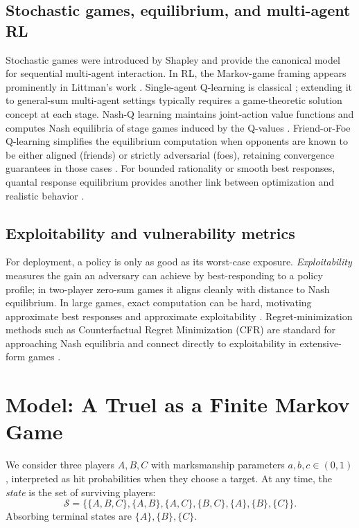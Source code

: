 \documentclass[11pt]{article}
\begin{document}
\subsection{Stochastic games, equilibrium, and multi-agent RL}
Stochastic games were introduced by Shapley \citep{Shapley1953} and provide the canonical model for sequential multi-agent interaction.
In RL, the Markov-game framing appears prominently in Littman's work \citep{Littman1994}.
Single-agent Q-learning is classical \citep{WatkinsDayan1992}; extending it to general-sum multi-agent settings typically requires a game-theoretic solution concept at each stage.
Nash-Q learning maintains joint-action value functions and computes Nash equilibria of stage games induced by the Q-values \citep{HuWellman2003}.
Friend-or-Foe Q-learning simplifies the equilibrium computation when opponents are known to be either aligned (friends) or strictly adversarial (foes), retaining convergence guarantees in those cases \citep{Littman2001}.
For bounded rationality or smooth best responses, quantal response equilibrium provides another link between optimization and realistic behavior \citep{McKelveyPalfrey1995}.

\subsection{Exploitability and vulnerability metrics}
For deployment, a policy is only as good as its worst-case exposure.
\emph{Exploitability} measures the gain an adversary can achieve by best-responding to a policy profile; in two-player zero-sum games it aligns cleanly with distance to Nash equilibrium.
In large games, exact computation can be hard, motivating approximate best responses and approximate exploitability \citep{TimbersEtAl2020}.
Regret-minimization methods such as Counterfactual Regret Minimization (CFR) are standard for approaching Nash equilibria and connect directly to exploitability in extensive-form games \citep{ZinkevichEtAl2007}.

\section{Model: A Truel as a Finite Markov Game}

We consider three players $A,B,C$ with marksmanship parameters $a,b,c \in (0,1)$, interpreted as hit probabilities when they choose a target.
At any time, the \emph{state} is the set of surviving players:
\[
\mathcal{S}=\{\{A,B,C\},\{A,B\},\{A,C\},\{B,C\},\{A\},\{B\},\{C\}\}.
\]
Absorbing terminal states are $\{A\},\{B\},\{C\}$.
\end{document}

